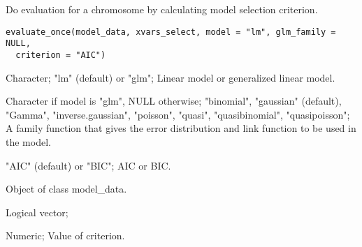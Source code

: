 %
\begin{Description}\relax
Do evaluation for a chromosome by calculating model selection criterion.
\end{Description}
%
\begin{Usage}
\begin{verbatim}
evaluate_once(model_data, xvars_select, model = "lm", glm_family = NULL,
  criterion = "AIC")
\end{verbatim}
\end{Usage}
%
\begin{Arguments}
\begin{ldescription}
\item[\code{model}] Character; "lm" (default) or "glm"; Linear model or generalized linear model.

\item[\code{glm\_family}] Character if model is "glm", NULL otherwise;
"binomial", "gaussian" (default), "Gamma", "inverse.gaussian", "poisson", "quasi",
"quasibinomial", "quasipoisson"; A family function that gives the error
distribution and link function to be used in the model.

\item[\code{criterion}] "AIC" (default) or "BIC"; AIC or BIC.

\item[\code{model\_data;}] Object of class model\_data.

\item[\code{xvars\_select;}] Logical vector;
\end{ldescription}
\end{Arguments}
%
\begin{Value}
Numeric; Value of criterion.
\end{Value}
